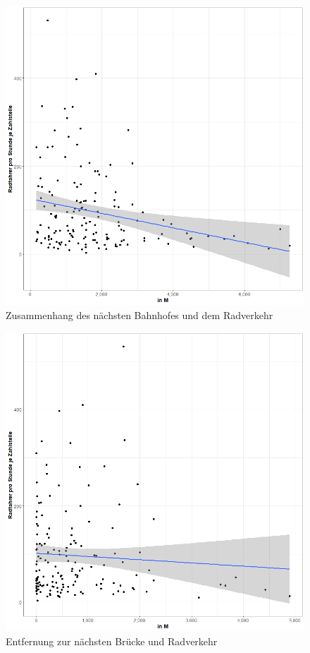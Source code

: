 \documentclass[a4paper,12pt]{thesis}
\begin{document}
\begin{figure}[!ht]
	\centering
	\includegraphics[width=\textwidth]{Plots/plot19.png}
	\caption{Zusammenhang des nächsten Bahnhofes und dem Radverkehr}
	\label{Train}
\end{figure}

\begin{figure}[!ht]
	\centering
	\includegraphics[width=\textwidth]{Plots/plot21.png}
	\caption{Entfernung zur nächsten Brücke und Radverkehr}
	\label{Bridge}
\end{figure}
\end{document}
